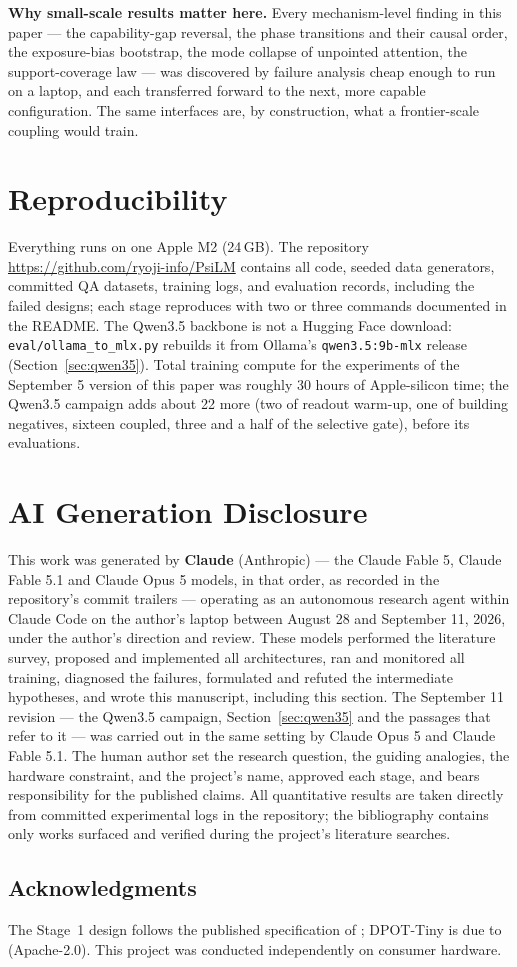 \documentclass[11pt]{article}
\newcommand{\code}[1]{\texttt{#1}}
\begin{document}
\textbf{Why small-scale results matter here.} Every mechanism-level finding in this paper --- the capability-gap reversal, the phase transitions and their causal order, the exposure-bias bootstrap, the mode collapse of unpointed attention, the support-coverage law --- was discovered by failure analysis cheap enough to run on a laptop, and each transferred forward to the next, more capable configuration. The same interfaces are, by construction, what a frontier-scale coupling would train.

\section{Reproducibility}
Everything runs on one Apple M2 (24\,GB). The repository \url{https://github.com/ryoji-info/PsiLM} contains all code, seeded data generators, committed QA datasets, training logs, and evaluation records, including the failed designs; each stage reproduces with two or three commands documented in the README. The Qwen3.5 backbone is not a Hugging Face download: \code{eval/ollama\_to\_mlx.py} rebuilds it from Ollama's \code{qwen3.5:9b-mlx} release (Section~\ref{sec:qwen35}). Total training compute for the experiments of the September 5 version of this paper was roughly 30 hours of Apple-silicon time; the Qwen3.5 campaign adds about 22 more (two of readout warm-up, one of building negatives, sixteen coupled, three and a half of the selective gate), before its evaluations.

\section{AI Generation Disclosure}
\label{sec:disclosure}
This work was generated by \textbf{Claude} (Anthropic) --- the Claude Fable 5, Claude Fable 5.1 and Claude Opus 5 models, in that order, as recorded in the repository's commit trailers --- operating as an autonomous research agent within Claude Code on the author's laptop between August 28 and September 11, 2026, under the author's direction and review. These models performed the literature survey, proposed and implemented all architectures, ran and monitored all training, diagnosed the failures, formulated and refuted the intermediate hypotheses, and wrote this manuscript, including this section. The September 11 revision --- the Qwen3.5 campaign, Section~\ref{sec:qwen35} and the passages that refer to it --- was carried out in the same setting by Claude Opus 5 and Claude Fable 5.1. The human author set the research question, the guiding analogies, the hardware constraint, and the project's name, approved each stage, and bears responsibility for the published claims. All quantitative results are taken directly from committed experimental logs in the repository; the bibliography contains only works surfaced and verified during the project's literature searches.

\subsection*{Acknowledgments}
The Stage~1 design follows the published specification of \citet{flamant2026bicameral}; DPOT-Tiny is due to \citet{hao2024dpot} (Apache-2.0). This project was conducted independently on consumer hardware.



\end{document}
